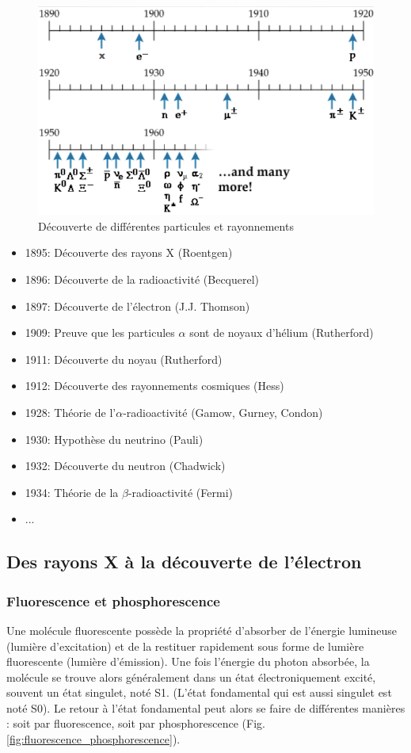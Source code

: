 \begin{figure}[ht]
    \centering
    \includegraphics[scale=0.50]{Images1/ldt.png}
    \caption{Découverte de différentes particules et rayonnements}
    \label{fig:decouvertes}
\end{figure}

\begin{itemize}
    \item 1895: Découverte des rayons X (Roentgen)
    \item 1896: Découverte de la radioactivité (Becquerel)
    \item 1897: Découverte de l'électron (J.J. Thomson)
    \item 1909: Preuve que les particules $\alpha$ sont de noyaux d'hélium (Rutherford)
    \item 1911: Découverte du noyau (Rutherford)
    \item 1912: Découverte des rayonnements cosmiques (Hess)
    \item 1928: Théorie de l'$\alpha$-radioactivité (Gamow, Gurney, Condon)
    \item 1930: Hypothèse du neutrino (Pauli)
    \item 1932: Découverte du neutron (Chadwick)
    \item 1934: Théorie de la $\beta$-radioactivité (Fermi)
    \item ...
\end{itemize}


\subsection{Des rayons X à la découverte de l'électron}
\subsubsection{Fluorescence et phosphorescence}
Une molécule fluorescente possède la propriété d'absorber de l'énergie lumineuse (lumière d'excitation) et de la restituer rapidement sous forme de lumière fluorescente (lumière d'émission). Une fois l'énergie du photon absorbée, la molécule se trouve alors généralement dans un état électroniquement excité, souvent un état singulet, noté S1. (L'état fondamental qui est aussi singulet est noté S0). Le retour à l'état fondamental peut alors se faire de différentes manières : soit par fluorescence, soit par phosphorescence (Fig. \ref{fig:fluorescence_phosphorescence}).

